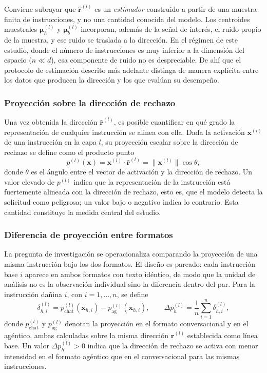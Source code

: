 \documentclass[12pt,a4paper]{article}
\begin{document}
Conviene subrayar que $\hat{\bm{r}}^{(l)}$ es un \textit{estimador} construido a partir de una muestra finita de instrucciones, y no una cantidad conocida del modelo. Los centroides muestrales $\bm{\mu}_{h}^{(l)}$ y $\bm{\mu}_{b}^{(l)}$ incorporan, además de la señal de interés, el ruido propio de la muestra, y ese ruido se traslada a la dirección. En el régimen de este estudio, donde el número de instrucciones es muy inferior a la dimensión del espacio ($n \ll d$), esa componente de ruido no es despreciable. De ahí que el protocolo de estimación descrito más adelante distinga de manera explícita entre los datos que producen la dirección y los que evalúan su desempeño.

\subsubsection*{Proyección sobre la dirección de rechazo}

Una vez obtenida la dirección $\hat{\bm{r}}^{(l)}$, es posible cuantificar en qué grado la representación de cualquier instrucción se alinea con ella. Dada la activación $\bm{x}^{(l)}$ de una instrucción en la capa $l$, su proyección escalar sobre la dirección de rechazo se define como el producto punto
\[
p^{(l)}(\bm{x}) = \bm{x}^{(l)} \cdot \hat{\bm{r}}^{(l)} = \lVert \bm{x}^{(l)} \rVert \cos\theta,
\]
donde $\theta$ es el ángulo entre el vector de activación y la dirección de rechazo. Un valor elevado de $p^{(l)}$ indica que la representación de la instrucción está fuertemente alineada con la dirección de rechazo, esto es, que el modelo detecta la solicitud como peligrosa; un valor bajo o negativo indica lo contrario. Esta cantidad constituye la medida central del estudio.

\subsubsection*{Diferencia de proyección entre formatos}

La pregunta de investigación se operacionaliza comparando la proyección de una misma instrucción bajo los dos formatos. El diseño es pareado: cada instrucción base $i$ aparece en ambos formatos con texto idéntico, de modo que la unidad de análisis no es la observación individual sino la diferencia dentro del par. Para la instrucción dañina $i$, con $i = 1, \dots, n$, se define
\[
\delta_{h,i}^{(l)} = p^{(l)}_{\text{chat}}(\bm{x}_{h,i}) - p^{(l)}_{\text{ag}}(\bm{x}_{h,i}),
\qquad
\Delta p_{h}^{(l)} = \frac{1}{n} \sum_{i=1}^{n} \delta_{h,i}^{(l)},
\]
donde $p^{(l)}_{\text{chat}}$ y $p^{(l)}_{\text{ag}}$ denotan la proyección en el formato conversacional y en el agéntico, ambas calculadas sobre la misma dirección $\hat{\bm{r}}^{(l)}$ establecida como línea base. Un valor $\Delta p_{h}^{(l)} > 0$ indica que la dirección de rechazo se activa con menor intensidad en el formato agéntico que en el conversacional para las mismas instrucciones.
\end{document}
